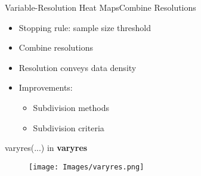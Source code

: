 \documentclass{beamer}
\begin{document}
\begin{frame}{Variable-Resolution Heat Maps}{Combine Resolutions}
\begin{itemize}
\addtolength{\itemsep}{0.5\baselineskip}
\item Stopping rule: sample size threshold
\item Combine resolutions
\item Resolution conveys data density
\item Improvements:
  \begin{itemize}
  \addtolength{\itemsep}{0.5\baselineskip}
  \item Subdivision methods
  \item Subdivision criteria
  \end{itemize}
\end{itemize}
\end{frame}

%
%
%
%
%
%
%
%
\begin{frame}{varyres(...) in {\bf varyres}}
  \begin{figure}[H]
	\centering
	\texttt{[image: Images/varyres.png]}
	\end{figure}
	\end{frame}
\end{document}

